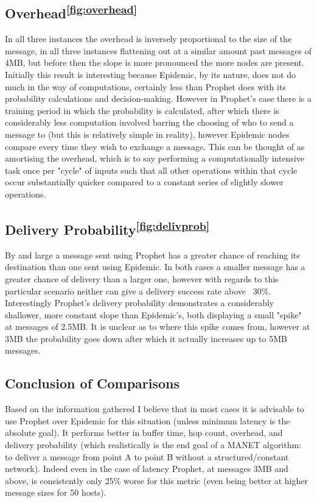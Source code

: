 \documentclass[12pt]{report}
\begin{document}
\subsection{Overhead\textsuperscript{\ref{fig:overhead}}}
In all three instances the overhead is inversely proportional to the size of the message, in all three instances flattening out at a similar amount past messages of 4MB, but before then the slope is more pronounced the more nodes are present.
Initially this result is interesting because Epidemic, by its nature, does not do much in the way of computations, certainly less than Prophet does with its probability calculations and decision-making.
However in Prophet's case there is a training period in which the probability is calculated, after which there is considerably less computation involved barring the choosing of who to send a message to (but this is relatively simple in reality), however Epidemic nodes compare every time they wish to exchange a message.
This can be thought of as amortising the overhead, which is to say performing a computationally intensive task once per "cycle" of inputs such that all other operations within that cycle occur substantially quicker compared to a constant series of slightly slower operations.

\subsection{Delivery Probability\textsuperscript{\ref{fig:delivprob}}}
By and large a message sent using Prophet has a greater chance of reaching its destination than one sent using Epidemic.
In both cases a smaller message has a greater chance of delivery than a larger one, however with regards to this particular scenario neither can give a delivery success rate above ~30\%.
Interestingly Prophet's delivery probability demonstrates a considerably shallower, more constant slope than Epidemic's, both displaying a small "spike" at messages of 2.5MB.
It is unclear as to where this spike comes from, however at 3MB the probability goes down after which it actually increases up to 5MB messages.

\subsection{Conclusion of Comparisons}
Based on the information gathered I believe that in most cases it is advisable to use Prophet over Epidemic for this situation (unless minimum latency is the absolute goal).
It performs better in buffer time, hop count, overhead, and delivery probability (which realistically is the end goal of a MANET algorithm: to deliver a message from point A to point B without a structured/constant network).
Indeed even in the case of latency Prophet, at messages 3MB and above, is consistently only 25\% worse for this metric (even being better at higher message sizes for 50 hosts).
\end{document}
